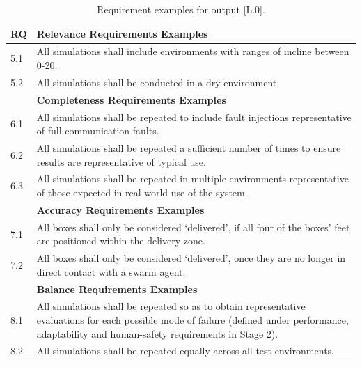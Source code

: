 \documentclass[runningheads]{llncs}
\begin{document}
\tiny
\begin{table}[!t]%
\centering
\begin{tabular}{p{0.6cm} p{11.6cm}}
	\textbf{RQ} & \textbf{Relevance Requirements Examples} \\
	\hline
	5.1 & All simulations shall include environments with ranges of incline between 0-20\textdegree.\\
	\hline
	5.2 & All simulations shall be conducted in a dry environment.\\
	\hline
	& \textbf{Completeness Requirements Examples} \\
	\hline
	6.1 & All simulations shall be repeated to include fault injections representative of full communication faults.\\
	\hline
	6.2 & All simulations shall be repeated a sufficient number of times to ensure results are representative of typical use.\\
	\hline
	6.3 & All simulations shall be repeated in multiple environments representative of those expected in real-world use of the system.\\
	\hline
	& \textbf{Accuracy Requirements Examples} \\
	\hline
	7.1 & All boxes shall only be considered `delivered’, if all four of the boxes’ feet are positioned within the delivery zone.\\
	\hline
	7.2 & All boxes shall only be considered `delivered’, once they are no longer in direct contact with a swarm agent.\\
	\hline
	& \textbf{Balance Requirements Examples} \\
	\hline
	8.1 & All simulations shall be repeated so as to obtain representative evaluations for each possible mode of failure (defined under performance, adaptability and human-safety requirements in Stage 2).\\
	\hline
	8.2 & All simulations shall be repeated equally across all test environments.\\
	\hline
\end{tabular}
\caption{Requirement examples for output [L.0].}
\label{tab:L0_req}
\vspace{-4ex}
\end{table}
\normalsize
\end{document}
